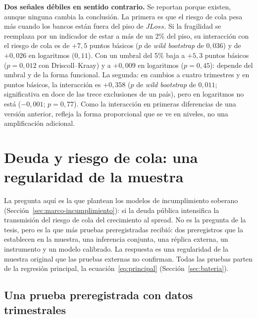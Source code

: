 \textbf{Dos señales débiles en sentido contrario.} Se reportan porque existen, aunque ninguna cambia la conclusión. La primera es que el riesgo de cola pesa más cuando los bancos están fuera del piso de $JLoss$. Si la fragilidad se reemplaza por un indicador de estar a más de un 2\% del piso, su interacción con el riesgo de cola es de $+7{,}5$ puntos básicos ($p$ de \textit{wild bootstrap} de $0{,}036$) y de $+0{,}026$ en logaritmos ($0{,}11$). Con un umbral del 5\% baja a $+5{,}3$ puntos básicos ($p=0{,}012$ con Driscoll--Kraay) y a $+0{,}009$ en logaritmos ($p=0{,}45$): depende del umbral y de la forma funcional. La segunda: en cambios a cuatro trimestres y en puntos básicos, la interacción es $+0{,}358$ ($p$ de \textit{wild bootstrap} de $0{,}011$; significativa en doce de las trece exclusiones de un país), pero en logaritmos no está ($-0{,}001$; $p=0{,}77$). Como la interacción en primeras diferencias de una versión anterior, refleja la forma proporcional que se ve en niveles, no una amplificación adicional.

\section{Deuda y riesgo de cola: una regularidad de la muestra}
\label{sec:hallazgo-central}

La pregunta aquí es la que plantean los modelos de incumplimiento soberano (Sección~\ref{sec:marco-incumplimiento}): si la deuda pública intensifica la transmisión del riesgo de cola del crecimiento al spread. No es la pregunta de la tesis, pero es la que más pruebas preregistradas recibió: dos preregistros que la establecen en la muestra, una inferencia conjunta, una réplica externa, un instrumento y un modelo calibrado. La respuesta es una regularidad de la muestra original que las pruebas externas no confirman. Todas las pruebas parten de la regresión principal, la ecuación~\eqref{eq:principal} (Sección~\ref{sec:bateria}).

\subsection{Una prueba preregistrada con datos trimestrales}
\label{sec:resiliencia-prereg}

